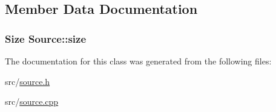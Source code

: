 \subsection{Member Data Documentation}
\hypertarget{class_source_aa801cdb298f6ce14f2ec12ab8f288dc3}{
\subsubsection[{size}]{\setlength{\rightskip}{0pt plus 5cm}Size {\bf Source::size}}}
\label{class_source_aa801cdb298f6ce14f2ec12ab8f288dc3}


The documentation for this class was generated from the following files:\begin{DoxyCompactItemize}
\item 
src/\hyperlink{source_8h}{source.h}\item 
src/\hyperlink{source_8cpp}{source.cpp}\end{DoxyCompactItemize}
